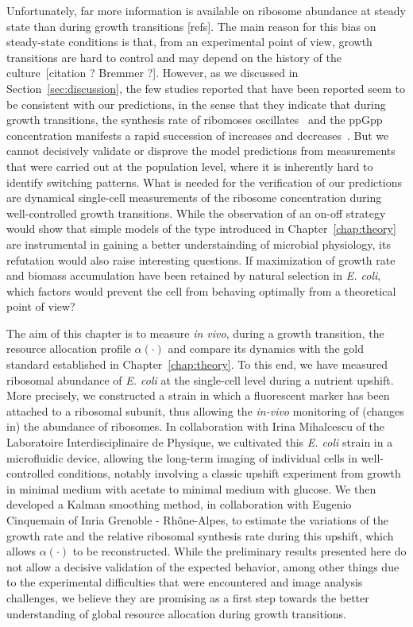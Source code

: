 Unfortunately, far more information is available on ribosome abundance at steady state than during growth transitions [refs].
The main reason for this bias on steady-state conditions is that, from an experimental point of view, growth transitions are hard to control and may depend on the history of the culture~[citation ? Bremmer ?].
However, as we discussed in Section~\ref{sec:discussion}, the few studies reported that have been reported seem to be consistent with our predictions, in the sense that they indicate that during growth transitions, the synthesis rate of ribomoses oscillates~\cite{gausing_regulation_1980,zengel_transcription_1986} and the ppGpp concentration manifests a rapid succession of increases and decreases~\cite{friesen_synthesis_1975,murray_control_2003}.
But we cannot decisively validate or disprove the model predictions from measurements that were carried out at the population level, where it is inherently hard to identify switching patterns.
What is needed for the verification of our predictions are dynamical single-cell measurements of the ribosome concentration during well-controlled growth transitions.
While the observation of an on-off strategy would show that simple models of the type introduced in Chapter~\ref{chap:theory} are instrumental in gaining a better understainding of microbial physiology, its refutation would also raise interesting questions. 
If maximization of growth rate and biomass accumulation have been retained by natural selection in \textit{E. coli}, which factors would prevent the cell from behaving optimally from a theoretical point of view?

The aim of this chapter is to measure \textit{in vivo}, during a growth transition, the resource allocation profile $\alpha (\cdot)$ and compare its dynamics with the gold standard established in Chapter~\ref{chap:theory}.
To this end, we have measured ribosomal abundance of \textit{E. coli} at the single-cell level during a nutrient upshift.
More precisely, we constructed a strain in which a fluorescent marker has been attached to a ribosomal subunit, thus allowing the \textit{in-vivo} monitoring of (changes in) the abundance of ribosomes.
In collaboration with Irina Mihalcescu of the Laboratoire Interdisciplinaire de Physique, we cultivated this \textit{E. coli} strain in a microfluidic device, allowing the long-term imaging of individual cells in well-controlled conditions, notably involving a classic upshift experiment from growth in minimal medium with acetate to minimal medium with glucose.
We then developed a Kalman smoothing method, in collaboration with Eugenio Cinquemain of Inria Grenoble - Rh\^{o}ne-Alpes, to estimate the variations of the growth rate and the relative ribosomal synthesis rate during this upshift, which allows $\alpha (\cdot)$ to be reconstructed.
While the preliminary results presented here do not allow a decisive validation of the expected behavior, among other things due to the experimental difficulties that were encountered and image analysis challenges, we believe they are promising as a first step towards the better understanding of global resource allocation during growth transitions.

